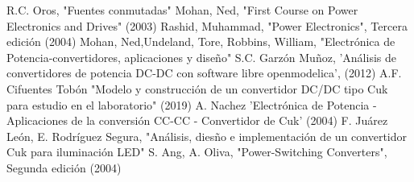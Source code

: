  R.C. Oros, "Fuentes conmutadas" 
 Mohan, Ned, "First Course on Power Electronics and Drives" (2003)
 Rashid, Muhammad, "Power Electronics", Tercera edición (2004)
 Mohan, Ned,Undeland, Tore, Robbins, William, "Electrónica de Potencia-convertidores, aplicaciones y diseño" 
 S.C. Garzón Muñoz,  'Análisis de convertidores de potencia DC-DC con
software libre openmodelica', (2012)
 A.F. Cifuentes Tobón "Modelo y construcción de un convertidor DC/DC tipo
Cuk para estudio en el laboratorio" (2019)
 A. Nachez 'Electrónica de Potencia - Aplicaciones de la conversión CC-CC - Convertidor de Cuk' (2004)
 F. Juárez León, E. Rodríguez Segura, "Análisis, diesño e implementación de un convertidor Cuk para iluminación LED"
 S. Ang, A. Oliva, "Power-Switching Converters", Segunda edición (2004)